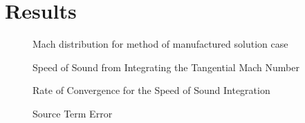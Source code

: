 \documentclass{article}
\begin{document}
\section{Results}
%
%
\begin{figure}
    \centering
    
    \caption{Mach distribution for method of manufactured solution case}
\end{figure}

 \begin{figure}
     \centering
         
 \end{figure}

 \begin{figure}
         
     \caption{Speed of Sound from Integrating the Tangential Mach Number}
 \end{figure}

%         

%         


 \begin{figure}
     \centering
         
     \caption{Rate of Convergence for the Speed of Sound Integration}
 \end{figure}

 \begin{figure}
         
     \caption{Source Term Error}
 \end{figure}
 \begin{figure}
         
 \end{figure}

 \begin{tiny}
     
 \end{tiny}

 \begin{tiny}
     
 \end{tiny}
%         
\end{document}
